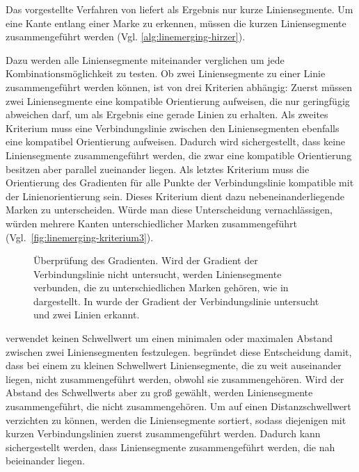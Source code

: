 Das vorgestellte Verfahren von \citeauthor{clarke96} liefert als Ergebnis nur kurze Liniensegmente. Um eine Kante
 entlang einer Marke zu erkennen, müssen die kurzen Liniensegmente zusammengeführt werden
 (Vgl. \autoref{alg:linemerging-hirzer}).

Dazu werden alle Liniensegmente miteinander verglichen um jede Kombinationsmöglichkeit zu testen. Ob zwei
 Liniensegmente zu einer Linie zusammengeführt werden können, ist von drei Kriterien abhängig: Zuerst müssen zwei
 Liniensegmente eine kompatible Orientierung aufweisen, die nur geringfügig abweichen darf, um als Ergebnis eine gerade
 Linien zu erhalten. Als zweites Kriterium muss eine Verbindungslinie zwischen den Liniensegmenten ebenfalls eine
 kompatibel Orientierung aufweisen. Dadurch wird sichergestellt, dass keine Liniensegmente zusammengeführt werden, die
 zwar eine kompatible Orientierung besitzen aber parallel zueinander liegen. Als letztes Kriterium muss die
 Orientierung des Gradienten für alle Punkte der Verbindungslinie kompatible mit der Linienorientierung sein. Dieses
 Kriterium dient dazu nebeneinanderliegende Marken zu unterscheiden. Würde man diese Unterscheidung vernachlässigen,
 würden mehrere Kanten unterschiedlicher Marken zusammengeführt (Vgl.~\autoref{fig:linemerging-kriterium3}).
\begin{figure}[!ht]
	\centering
	\caption{Überprüfung des Gradienten. Wird der Gradient der Verbindungslinie nicht untersucht, werden Liniensegmente
	 verbunden, die zu unterschiedlichen Marken gehören, wie in  dargestellt. In
	  wurde der Gradient der Verbindungslinie untersucht und zwei Linien erkannt.}
	\label{fig:linemerging-kriterium3}
\end{figure}

\citeauthor{hirzer08} verwendet keinen Schwellwert um einen minimalen oder maximalen Abstand zwischen zwei
 Liniensegmenten festzulegen. \citeauthor{hirzer08} begründet diese Entscheidung damit, dass bei einem zu kleinen
 Schwellwert Liniensegmente, die zu weit auseinander liegen, nicht zusammengeführt werden, obwohl sie zusammengehören.
 Wird der Abstand des Schwellwerts aber zu groß gewählt, werden Liniensegmente zusammengeführt, die nicht
 zusammengehören. Um auf einen Distanzschwellwert verzichten zu können, werden die Liniensegmente sortiert, sodass
 diejenigen mit kurzen Verbindungslinien zuerst zusammengeführt werden. Dadurch kann sichergestellt werden, dass
 Liniensegmente zusammengeführt werden, die nah beieinander liegen.

